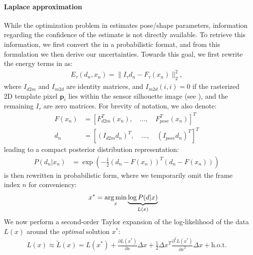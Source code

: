 \paragraph{Laplace approximation}
\label{sec:posterior}
While the optimization problem in  estimates pose/shape parameters, information regarding the confidence of the estimate is not directly available. To retrieve this information, we first convert the  in a probabilistic format, and from this formulation we then derive our uncertainties. Towards this goal, we first rewrite the energy terms in  as:
% 
\begin{align}
E_{\tau}(d_n, x_n) = \|I_{\tau} d_n - F_{\tau} (x_n)\|_2^2,
\end{align} 
where $I_{d2m}$ and $I_{m2d}$ are identity matrices, and $I_{m2d}(i,i)=0$ if the rasterized 2D template pixel $\mathbf{p}_i$ lies within the sensor silhouette image  (see \cite{htrack}), and the remaining $I_{\tau}$ are zero matrices.
For brevity of notation, we also denote:
% 
\begin{align*}
F(x_n) &= \left[F_{d2m}^T(x_n), \quad ..., \quad F_{pose}^T(x_n)\right]^T \\
d_n &= \left[(I_{d2m} d_n)^T, \quad ..., \quad (I_{pose} d_n)^T\right]^T
\end{align*}
% 
leading to a compact posterior distribution representation:
% 
\begin{align}
P(d_n|x_n) &= \exp \left( - \tfrac{1}{2}(d_n - F(x_n))^T (d_n - F(x_n)) \right)
\label{eq:posterior}
\end{align}
% 
 is then rewritten in probabilistic form, where we temporarily omit the frame index $n$ for conveniency:
%
\begin{align}
x^* &= \operatorname*{arg\,min}_{x} \underbrace{\log  P(d|x)}_{L(x)}
\label{eq:independent}
\end{align}
%
We now perform a second-order Taylor expansion of the log-likelihood of the data $L(x)$ around the \emph{optimal} solution $x^*$:
%
\begin{align*}
L(x) \approx \tilde{L}(x) = L(x^*)   
+ \tfrac{\partial L(x^*) }{\partial x}  \Delta x 
+ \tfrac{1}{2} \Delta x^T\tfrac{\partial^2 L(x^*)}{{\partial x}^2} \Delta x + \text{h.o.t.}
\end{align*}
